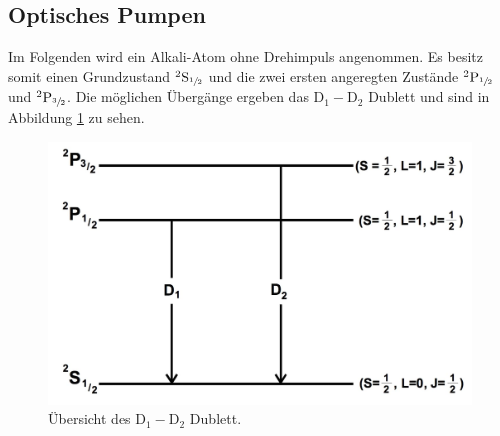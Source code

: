 \subsection{Optisches Pumpen}
Im Folgenden wird ein Alkali-Atom ohne Drehimpuls angenommen. Es besitz somit einen Grundzustand ${}^2\mathrm{S}_{\sfrac{1}{2}}$ und die zwei ersten angeregten Zustände ${}^2\mathrm{P}_{\sfrac{1}{2}}$ und ${}^2\mathrm{P}_{\sfrac{3}{2}}$. Die möglichen Übergänge ergeben das $\mathrm{D}_1-\mathrm{D}_2$ Dublett und sind in Abbildung \ref{fig:dublett} zu sehen.
\begin{figure}[H]
	\centering
	\includegraphics[width=0.8\linewidth]{img/dublett.jpg}
	\caption{Übersicht des $\mathrm{D}_1-\mathrm{D}_2$ Dublett.\cite{V21}}
	\label{fig:dublett}
\end{figure}

